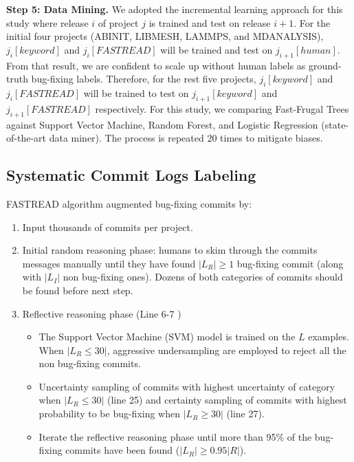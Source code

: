 \documentclass[sigconf,review, anonymous]{acmart}
\newcommand{\bi}{\begin{itemize}[leftmargin=0.4cm]}
\newcommand{\ei}{\end{itemize}}
\begin{document}
\noindent \textbf{Step 5: Data Mining.} We adopted the incremental learning approach for this study where release $i$ of project $j$ is trained and test on release $i+1$. 
For the initial four projects (ABINIT, LIBMESH, LAMMPS, and MDANALYSIS), $j_i[keyword]$ and $j_i[FASTREAD]$ will be trained and test on $j_{i+1}[human]$. From that result, we are confident to scale up without human labels as ground-truth bug-fixing labels. 
Therefore, for the rest five projects, $j_i[keyword]$ and $j_i[FASTREAD]$ \hspace{0.05cm} will be trained to test on \hspace{0.05cm} $j_{i+1}[keyword]$ \hspace{0.05cm} and $j_{i+1}[FASTREAD]$ respectively. 
For this study, we comparing Fast-Frugal Trees against Support Vector Machine, Random Forest, and Logistic Regression (state-of-the-art data miner). The process is repeated 20 times to mitigate biases.  


\subsection{Systematic Commit Logs Labeling}

FASTREAD algorithm \cite{Yu2018} augmented bug-fixing commits by:
\begin{enumerate}
    \item Input thousands of commits per project.
    \item Initial random reasoning phase: humans to skim through the commits messages manually until they have found $|L_R| \geq 1$ bug-fixing commit (along with $|L_I|$ non bug-fixing ones). Dozens of both categories of commits should be found before next step.
    \item Reflective reasoning phase (Line 6-7 \cite{Yu2018})
    \bi
    \item The Support Vector Machine (SVM) model is trained on the $L$ examples. When $|L_R \leq 30|$, aggressive undersampling  are employed to reject all the non bug-fixing commits. 
    \item Uncertainty sampling of commits with highest uncertainty of category when $|L_R \leq 30|$ (line 25) and certainty sampling of commits with highest probability to be bug-fixing when $|L_R \geq 30|$ (line 27).   
    \item Iterate the reflective reasoning phase until more than 95\% of the bug-fixing commits have been found ($|L_R| \geq 0.95|R|$).
    \ei
\end{enumerate}
\end{document}
